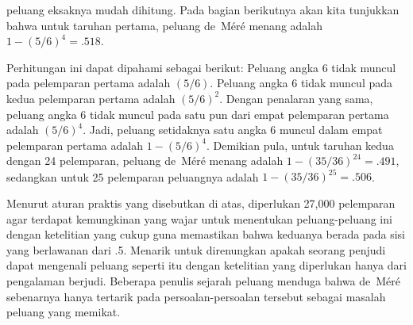 peluang eksaknya mudah dihitung.  Pada bagian berikutnya akan kita tunjukkan bahwa untuk taruhan pertama,
peluang de~M\'er\'e menang adalah $1 - (5/6)^4 = .518$. 
\par 
Perhitungan ini dapat dipahami sebagai berikut:  Peluang angka 6 tidak
muncul pada pelemparan pertama adalah $(5/6)$.  Peluang angka 6 tidak muncul pada
kedua pelemparan pertama adalah $(5/6)^2$.  Dengan penalaran yang sama,
peluang angka 6 tidak muncul pada satu pun dari empat pelemparan pertama adalah $(5/6)^4$. 
Jadi, peluang setidaknya satu angka 6 muncul dalam empat pelemparan pertama adalah $1 -
(5/6)^4$.  Demikian pula, untuk taruhan kedua dengan 24 pelemparan, peluang
de~M\'er\'e
menang adalah $1 - (35/36)^{24} = .491$, sedangkan untuk 25 pelemparan peluangnya adalah $1 - (35/36)^{25}
= .506$.  
\par
Menurut aturan praktis yang disebutkan di atas,
diperlukan 27,000 pelemparan agar terdapat kemungkinan yang wajar untuk menentukan peluang-peluang ini dengan
ketelitian yang cukup guna memastikan bahwa keduanya berada pada sisi yang berlawanan dari .5.  Menarik untuk direnungkan
apakah seorang penjudi dapat mengenali peluang seperti itu dengan ketelitian yang diperlukan hanya dari pengalaman
berjudi.  Beberapa penulis sejarah peluang menduga bahwa de~M\'er\'e sebenarnya
hanya tertarik pada persoalan-persoalan tersebut sebagai masalah peluang yang memikat.

